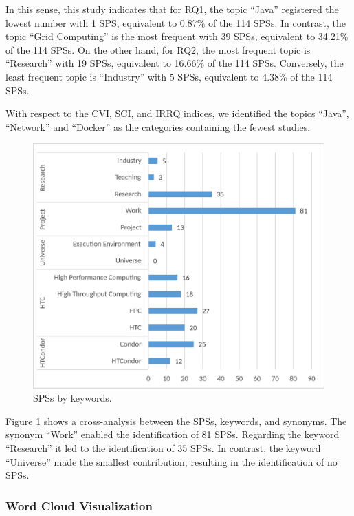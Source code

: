 In this sense, this study indicates that for RQ1, the topic ``Java'' registered the lowest number with 1 SPS, equivalent to 0.87\% of the 114 SPSs. In contrast, the topic ``Grid Computing'' is the most frequent with 39 SPSs, equivalent to 34.21\% of the 114 SPSs. On the other hand, for RQ2, the most frequent topic is ``Research'' with 19 SPSs, equivalent to 16.66\% of the 114 SPSs. Conversely, the least frequent topic is ``Industry'' with 5 SPSs, equivalent to 4.38\% of the 114 SPSs.

With respect to the CVI, SCI, and IRRQ indices, we identified the topics ``Java'', ``Network'' and ``Docker'' as the categories containing the fewest studies.

\begin{figure}[ht]
	\centering
	\includegraphics[scale=0.179]{resources/figures/Imagen6.eps}
	\caption{SPSs by keywords.}
	\label{fig:SPSsByKeywords}
\end{figure}

Figure \ref{fig:SPSsByKeywords} shows a cross-analysis between the SPSs, keywords, and synonyms. The synonym ``Work'' enabled the identification of 81 SPSs. Regarding the keyword ``Research'' it led to the identification of 35 SPSs. In contrast, the keyword ``Universe'' made the smallest contribution, resulting in the identification of no SPSs.

\subsubsection{Word Cloud Visualization}

